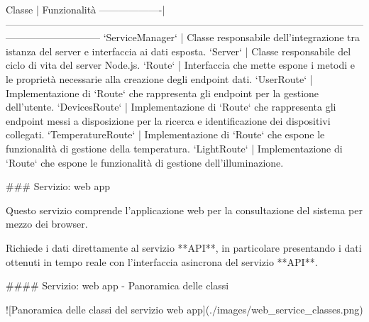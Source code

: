 Classe             | Funzionalità
-------------------|-----------------------------------------------------------------------------------------------------------------------------------------
`ServiceManager`   | Classe responsabile dell'integrazione tra istanza del server e interfaccia ai dati esposta.
`Server`           | Classe responsabile del ciclo di vita del server Node.js.
`Route`            | Interfaccia che mette espone i metodi e le proprietà necessarie alla creazione degli endpoint dati.
`UserRoute`        | Implementazione di `Route` che rappresenta gli endpoint per la gestione dell'utente.
`DevicesRoute`     | Implementazione di `Route` che rappresenta gli endpoint messi a disposizione per la ricerca e identificazione dei dispositivi collegati.
`TemperatureRoute` | Implementazione di `Route` che espone le funzionalità di gestione della temperatura.
`LightRoute`       | Implementazione di `Route` che espone le funzionalità di gestione dell'illuminazione.

### Servizio: web app

Questo servizio comprende l'applicazione web per la consultazione del sistema per mezzo dei browser.

Richiede i dati direttamente al servizio **API**, in particolare presentando i dati ottenuti in tempo reale con l'interfaccia asincrona del servizio **API**.

#### Servizio: web app - Panoramica delle classi

![Panoramica delle classi del servizio web app](./images/web_service_classes.png)

